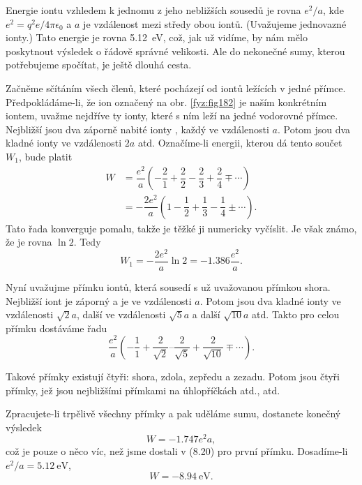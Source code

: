     Energie iontu vzhledem k jednomu z jeho nebližších sousedů je rovna \(e^2/a\), kde
    \(e^2=q^2e/4πϵ_0\) a \(a\) je vzdálenost mezi středy obou iontů. (Uvažujeme jednovazné ionty.)
    Tato energie je rovna \SI{5.12}{\electronvolt}, což, jak už vidíme, by nám mělo poskytnout
    výsledek o řádově správné velikosti. Ale do nekonečné sumy, kterou potřebujeme spočítat, je
    ještě dlouhá cesta.

    Začněme sčítáním všech členů, které pocházejí od iontů ležících v jedné přímce.
    Předpokládáme-li, že ion označený  na obr. \ref{fyz:fig182} je naším konkrétním iontem,
    uvažme nejdříve ty ionty, které s ním leží na jedné vodorovné přímce. Nejbližší jsou dva záporně
    nabité ionty , každý ve vzdálenosti \(a\). Potom jsou dva kladné ionty ve vzdálenosti
    \(2a\) atd. Označíme-li energii, kterou dá tento součet \(W_1\), bude platit
    \begin{align*}
      W &= \dfrac{e^2}{a}\left(−\dfrac{2}{1}+\dfrac{2}{2}−\dfrac{2}{3}+\dfrac{2}{4}∓\cdots\right) \\
        &=−\dfrac{2e^2}{a}\left(1−\dfrac{1}{2}+\dfrac{1}{3}−\dfrac{1}{4}±\cdots\right).
    \end{align*}
    Tato řada konverguje pomalu, takže je těžké ji numericky vyčíslit. Je však známo, že je rovna
    \(\ln2\). Tedy
    \begin{equation}\label{fyz:eq886}
      W_1=−\dfrac{2e^2}{a}\ln2=−\num{1.386}\dfrac{e^2}{a}.
    \end{equation}

    Nyní uvažujme přímku iontů, která sousedí s už uvažovanou přímkou shora. Nejbližší iont je
    záporný a je ve vzdálenosti \(a\). Potom jsou dva kladné ionty ve vzdálenosti \(\sqrt{2}a\),
    další ve vzdálenosti \(\sqrt{5}a\) a další \(\sqrt{10}a\) atd. Takto pro celou přímku dostáváme
    řadu
    \begin{equation}\label{fyz:eq887}
      \dfrac{e^2}{a}\left(−\dfrac{1}{1}+\dfrac{2}{\sqrt{2}}
                          –\dfrac{2}{\sqrt{5}}+\dfrac{2}{\sqrt{10}}∓\cdots
                    \right).
    \end{equation}

    Takové přímky existují čtyři: shora, zdola, zepředu a zezadu. Potom jsou čtyři přímky, jež jsou
    nejbližšími přímkami na úhlopříčkách atd., atd.

    Zpracujete-li trpělivě všechny přímky a pak uděláme sumu, dostanete konečný výsledek
    \begin{equation*}
      W=−\num{1.747}e^2a,
    \end{equation*}
    což je pouze o něco víc, než jsme dostali v (8.20) pro první přímku. Dosadíme-li \(e^2/a =
    \SI{5.12}{\electronvolt}\), 
    \begin{equation*}
      W=−\SI{8.94}{\electronvolt}.
    \end{equation*}

